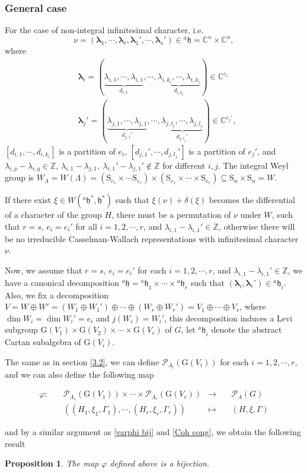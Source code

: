 \documentclass[12pt, a4paper]{amsart}
\numberwithin{equation}{section}
\newtheorem{prop}[thm]{Proposition}
\newcommand{\blam}{{\boldsymbol{\lambda}}}
\newcommand{\BC}{{\mathbb {C}}}
\newcommand{\BZ}{{\mathbb {Z}}}
\newcommand{\CP}{{\mathcal {P}}}
\newcommand{\fh}{\mathfrak{h}}
\newcommand{\G}{{\mathrm{G}}}
\newcommand{\defmap}[5]{
           \begin{equation*}
              \begin{aligned}
                   #1:\quad  & #2 &\longrightarrow &\quad #3 \\
                      \quad  & #4    &\longmapsto  &\quad #5
              \end{aligned}
           \end{equation*}
          }
\begin{document}
\subsubsection{General case}
For the case of non-integral infinitesimal character, i.e. 
$$\nu = (\blam_1, \cdots, \blam_r, \blam_1',\cdots, \blam_s') \in {^{a}\fh} = \BC^n \times \BC^n,$$ 
where 
\begin{align}
    &\blam_i = (\underbrace{\lambda_{i,1}, \cdots,\lambda_{i,1}}_{d_{i,1}},\cdots,\underbrace{\lambda_{i,k_i},\cdots,\lambda_{i,k_i}}_{d_{i,k_i}}) \in \BC^{e_i}\\
    &\blam_j' = (\underbrace{\lambda_{j,1},\cdots,\lambda_{j,1}}_{d_{j,1}'}, \cdots ,\underbrace{\lambda_{j,l_j},\cdots, \lambda_{j,l_j}}_{d_{j,l_j}'}) \in \BC^{e_j'},
\end{align}
 $[d_{i,1} , \cdots , d_{i,k_i}]$ is a partition of $e_i$, $[d_{j,1}', \cdots , d_{j,l_j}']$ is a partition of $e_j'$, and $\lambda_{i,p} - \lambda_{i,q} \in \BZ$, $\lambda_{i,1} - \lambda_{j,1}, \ \lambda_{i,1}' - \lambda_{j,1}' \notin \BZ$ for different $i,j$. The integral Weyl group is $W_\Lambda = W(\Lambda) = (\mathrm{S}_{e_1} \times \cdots \mathrm{S}_{e_r}) \times (\mathrm{S}_{e_1} \times \cdots \times \mathrm{S}_{e_r}) \subseteq \mathrm{S}_n \times \mathrm{S}_n = W$.

If there exist $\xi \in W({^{a}\fh^*},\fh^*)$ such that $\xi(\nu) + \delta(\xi)$ becomes the differential of a character of the group $H$, there must be a permutation of $\nu$ under $W$, such that $r = s$, $e_i = e_i'$ for all $i = 1,2,\cdots,r$, and $\lambda_{i,1} - \lambda_{i,1}' \in \BZ$, otherwise there will be no irreducible Casselman-Wallach representations with infinitesimal character $\nu$.

Now, we assume that $r = s$, $e_i = e_i'$ for each $i =1,2,\cdots,r$, and $\lambda_{i,1} - \lambda_{i,1}' \in \BZ$, we have a canonical decomposition $^{a}\fh = {^{a}\fh_1} \times \cdots \times {^{a}\fh_r}$ such that $(\blam_i, \blam_i')\in {^{a}\fh_i}$. Also, we fix a decomposition $V = W \oplus W' = (W_1 \oplus W_1') \oplus \cdots \oplus (W_r \oplus W_r') = V_1 \oplus \cdots \oplus V_r$, where $\dim W_i = \dim W_i' = e_i$ and $j(W_i) = W_i'$, this decomposition induces a Levi subgroup $\G(V_1) \times \G (V_2) \times \cdots \times \G(V_r)$ of $G$, let $^{a}\fh_i$ denote the abstract Cartan subalgebra of $\G(V_i)$. 

The same as in section \ref{3.2}, we can define $\CP_{\Lambda_i}(\G(V_i))$ for each $i = 1,2,\cdots,r$, and we can also define the following map
\defmap{\varphi}{\CP_{\Lambda_1}(\G(V_1))\times \cdots \times \CP_{\Lambda_r}(\G(V_r))}{\CP_{\Lambda}(G)}{((H_1,\xi_1,\Gamma_1),\cdots, (H_r,\xi_r,\Gamma_r))}{(H,\xi,\Gamma)}
and by a similar argument as \ref{varphi bij} and \ref{Coh cong}, we obtain the following result
\begin{prop}
    The map $\varphi$ defined above is a bijection.
\end{prop}
\end{document}
